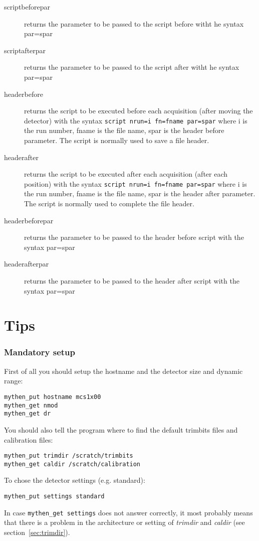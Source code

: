 \documentclass{report}
\begin{document}
\begin{description}
\item[scriptbeforepar] returns the parameter to be passed to the script before witht he syntax par=spar 
\item[scriptafterpar] returns the parameter to be passed to the script after witht he syntax par=spar 
\item[headerbefore] returns the script to be executed before each acquisition (after moving the detector) with the syntax \verb|script nrun=i fn=fname par=spar| where i is the run number, fname is the file name, spar is the header before parameter. The script is normally used to save a file header.
\item[headerafter] returns the script to be executed after each acquisition (after each position) with the syntax \verb|script nrun=i fn=fname par=spar| where i is the run number, fname is the file name, spar is the header after parameter. The script is normally used to complete the file header.
\item[headerbeforepar] returns the  parameter to be passed to the header before script with the syntax par=spar
\item[headerafterpar]returns the parameter to be passed to the header after script with the syntax par=spar
\end{description}

\section{Tips}

\subsubsection{Mandatory setup}
First of all you should setup the hostname and the detector size and dynamic range:
\begin{verbatim}
mythen_put hostname mcs1x00
mythen_get nmod
mythen_get dr
\end{verbatim}
You should also tell the program where to find the default trimbits files and calibration files: 
\begin{verbatim}
mythen_put trimdir /scratch/trimbits
mythen_get caldir /scratch/calibration
\end{verbatim}
To chose the detector settings (e.g. standard):
\begin{verbatim}
mythen_put settings standard
\end{verbatim}
In case \verb=mythen_get settings= does not answer correctly, it most probably means that there is a problem in the architecture or setting of \textit{trimdir} and \textit{caldir} (see section~\ref{sec:trimdir}).
\end{document}
